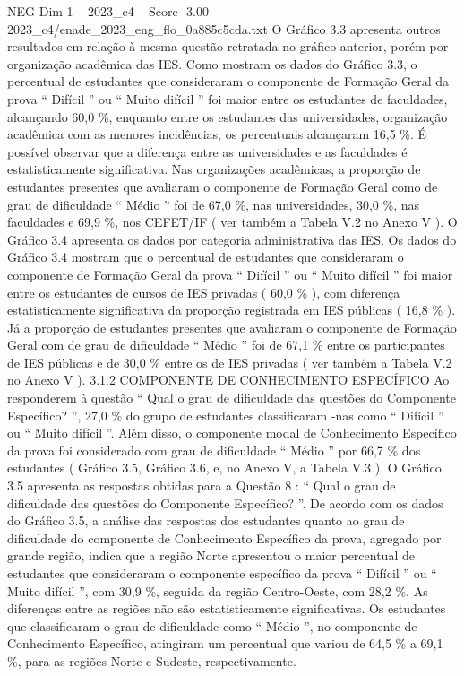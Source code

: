 \begin{textsample}{NEG Dim 1 – 2023\_c4 – Score -3.00 – 2023\_c4/enade\_2023\_eng\_flo\_0a885c5cda.txt}
O Gráfico 3.3 apresenta outros resultados em relação à mesma questão retratada no gráfico anterior, porém por organização acadêmica das IES.
Como mostram os dados do Gráfico 3.3, o percentual de estudantes que consideraram o componente de Formação Geral da prova “ Difícil ” ou “ Muito difícil ” foi maior entre os estudantes de faculdades, alcançando 60,0 \%, enquanto entre os estudantes das universidades, organização acadêmica com as menores incidências, os percentuais alcançaram 16,5 \%.
É possível observar que a diferença entre as universidades e as faculdades é estatisticamente significativa.
Nas organizações acadêmicas, a proporção de estudantes presentes que avaliaram o componente de Formação Geral como de grau de dificuldade “ Médio ” foi de 67,0 \%, nas universidades, 30,0 \%, nas faculdades e 69,9 \%, nos CEFET/IF ( ver também a Tabela V.2 no Anexo V ).
O Gráfico 3.4 apresenta os dados por categoria administrativa das IES.
Os dados do Gráfico 3.4 mostram que o percentual de estudantes que consideraram o componente de Formação Geral da prova “ Difícil ” ou “ Muito difícil ” foi maior entre os estudantes de cursos de IES privadas ( 60,0 \% ), com diferença estatisticamente significativa da proporção registrada em IES públicas ( 16,8 \% ).
Já a proporção de estudantes presentes que avaliaram o componente de Formação Geral com de grau de dificuldade “ Médio ” foi de 67,1 \% entre os participantes de IES públicas e de 30,0 \% entre os de IES privadas ( ver também a Tabela V.2 no Anexo V ). 3.1.2 COMPONENTE DE CONHECIMENTO ESPECÍFICO Ao responderem à questão “ Qual o grau de dificuldade das questões do Componente Específico? ”, 27,0 \% do grupo de estudantes classificaram -nas como “ Difícil ” ou “ Muito difícil ”.
Além disso, o componente modal de Conhecimento Específico da prova foi considerado com grau de dificuldade “ Médio ” por 66,7 \% dos estudantes ( Gráfico 3.5, Gráfico 3.6, e, no Anexo V, a Tabela V.3 ).
O Gráfico 3.5 apresenta as respostas obtidas para a Questão 8 : “ Qual o grau de dificuldade das questões do Componente Específico? ”.
De acordo com os dados do Gráfico 3.5, a análise das respostas dos estudantes quanto ao grau de dificuldade do componente de Conhecimento Específico da prova, agregado por grande região, indica que a região Norte apresentou o maior percentual de estudantes que consideraram o componente específico da prova “ Difícil ” ou “ Muito difícil ”, com 30,9 \%, seguida da região Centro-Oeste, com 28,2 \%.
As diferenças entre as regiões não são estatisticamente significativas.
Os estudantes que classificaram o grau de dificuldade como “ Médio ”, no componente de Conhecimento Específico, atingiram um percentual que variou de 64,5 \% a 69,1 \%, para as regiões Norte e Sudeste, respectivamente.

\end{textsample}
